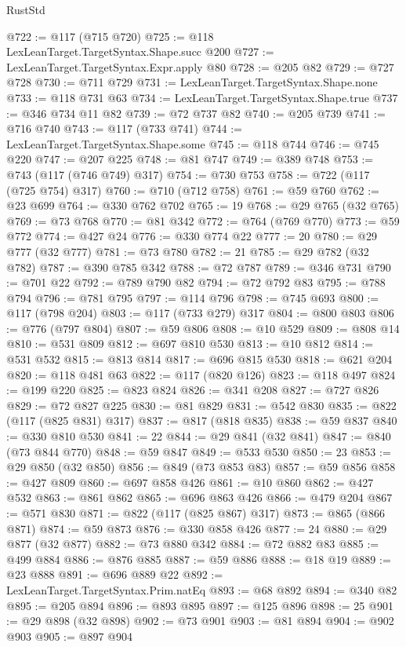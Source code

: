 \begin{lexlean}{RustStd}
\begin{coremodule}
{\begin{coremodule}
{{{{{{{{{{{{{{{{{{{{{{{{{{{{{{{{{{{{{{{{{{{{{{{{{{{{{{{@722 := @117 (@715 @720)
@725 := @118 LexLeanTarget.TargetSyntax.Shape.succ @200
@727 := LexLeanTarget.TargetSyntax.Expr.apply @80
@728 := @205 @82
@729 := @727 @728
@730 := @711 @729
@731 := LexLeanTarget.TargetSyntax.Shape.none
@733 := @118 @731 @63
@734 := LexLeanTarget.TargetSyntax.Shape.true
@737 := @346 @734 @11 @82
@739 := @72 @737 @82
@740 := @205 @739
@741 := @716 @740
@743 := @117 (@733 @741)
@744 := LexLeanTarget.TargetSyntax.Shape.some
@745 := @118 @744
@746 := @745 @220
@747 := @207 @225
@748 := @81 @747
@749 := @389 @748
@753 := @743 (@117 (@746 @749) @317)
@754 := @730 @753
@758 := @722 (@117 (@725 @754) @317)
@760 := @710 (@712 @758)
@761 := @59 @760
@762 := @23 @699
@764 := @330 @762 @702
@765 := 19
@768 := @29 @765 (@32 @765)
@769 := @73 @768
@770 := @81 @342
@772 := @764 (@769 @770)
@773 := @59 @772
@774 := @427 @24
@776 := @330 @774 @22
@777 := 20
@780 := @29 @777 (@32 @777)
@781 := @73 @780
@782 := 21
@785 := @29 @782 (@32 @782)
@787 := @390 @785 @342
@788 := @72 @787
@789 := @346 @731
@790 := @701 @22
@792 := @789 @790 @82
@794 := @72 @792 @83
@795 := @788 @794
@796 := @781 @795
@797 := @114 @796
@798 := @745 @693
@800 := @117 (@798 @204)
@803 := @117 (@733 @279) @317
@804 := @800 @803
@806 := @776 (@797 @804)
@807 := @59 @806
@808 := @10 @529
@809 := @808 @14
@810 := @531 @809
@812 := @697 @810 @530
@813 := @10 @812
@814 := @531 @532
@815 := @813 @814
@817 := @696 @815 @530
@818 := @621 @204
@820 := @118 @481 @63
@822 := @117 (@820 @126)
@823 := @118 @497
@824 := @199 @220
@825 := @823 @824
@826 := @341 @208
@827 := @727 @826
@829 := @72 @827 @225
@830 := @81 @829
@831 := @542 @830
@835 := @822 (@117 (@825 @831) @317)
@837 := @817 (@818 @835)
@838 := @59 @837
@840 := @330 @810 @530
@841 := 22
@844 := @29 @841 (@32 @841)
@847 := @840 (@73 @844 @770)
@848 := @59 @847
@849 := @533 @530
@850 := 23
@853 := @29 @850 (@32 @850)
@856 := @849 (@73 @853 @83)
@857 := @59 @856
@858 := @427 @809
@860 := @697 @858 @426
@861 := @10 @860
@862 := @427 @532
@863 := @861 @862
@865 := @696 @863 @426
@866 := @479 @204
@867 := @571 @830
@871 := @822 (@117 (@825 @867) @317)
@873 := @865 (@866 @871)
@874 := @59 @873
@876 := @330 @858 @426
@877 := 24
@880 := @29 @877 (@32 @877)
@882 := @73 @880 @342
@884 := @72 @882 @83
@885 := @499 @884
@886 := @876 @885
@887 := @59 @886
@888 := @18 @19
@889 := @23 @888
@891 := @696 @889 @22
@892 := LexLeanTarget.TargetSyntax.Prim.natEq
@893 := @68 @892
@894 := @340 @82
@895 := @205 @894
@896 := @893 @895
@897 := @125 @896
@898 := 25
@901 := @29 @898 (@32 @898)
@902 := @73 @901
@903 := @81 @894
@904 := @902 @903
@905 := @897 @904
}}}}}}}}}}}}}}}}}}}}}}}}}}}}}}}}}}}}}}}}}}}}}}}}}}}}}}}
\end{coremodule}}
\end{coremodule}
\end{lexlean}
